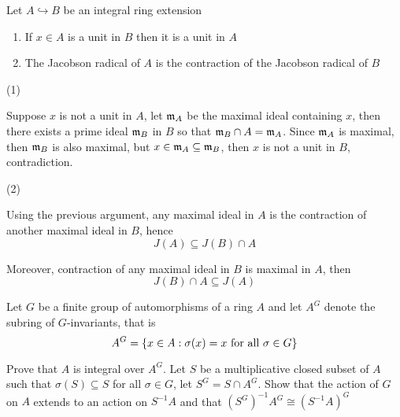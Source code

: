 \begin{problem}
	Let $A \hookrightarrow B$ be an integral ring extension
	\begin{enumerate}
		\item If $x \in A$ is a unit in $B$ then it is a unit in $A$
		\item The Jacobson radical of $A$ is the contraction of the Jacobson radical of $B$
	\end{enumerate}
\end{problem}

\begin{longproof}
	(1)
	
	Suppose $x$ is not a unit in $A$, let $\mathfrak{m}_A$ be the maximal ideal containing $x$, then there exists a prime ideal $\mathfrak{m}_B$ in $B$ so that $\mathfrak{m}_B \cap A = \mathfrak{m}_A$. Since $\mathfrak{m}_A$ is maximal, then $\mathfrak{m}_B$ is also maximal, but $x \in \mathfrak{m}_A \subseteq \mathfrak{m}_B$, then $x$ is not a unit in $B$, contradiction.
	
	(2)
	
	Using the previous argument, any maximal ideal in $A$ is the contraction of another maximal ideal in $B$, hence 
	$$
		J(A) \subseteq J(B) \cap A
	$$
	
	Moreover, contraction of any maximal ideal in $B$ is maximal in $A$, then 
	$$
		J(B) \cap A \subseteq J(A)
	$$
\end{longproof}

\begin{problem}
	Let $G$ be a finite group of automorphisms of a ring $A$ and let $A^G$ denote the subring of $G$-invariants, that is
	$$
		A^G = \{x \in A: \sigma(x) = x \text{ for all } \sigma \in G\}
	$$
	
	Prove that $A$ is integral over $A^G$. Let $S$ be a multiplicative closed subset of $A$ such that $\sigma(S) \subseteq S$ for all $\sigma \in G$, let $S^G = S \cap A^G$. Show that the action of $G$ on $A$ extends to an action on $S^{-1} A$ and that $(S^G)^{-1} A^G \cong (S^{-1} A)^G$
\end{problem}

